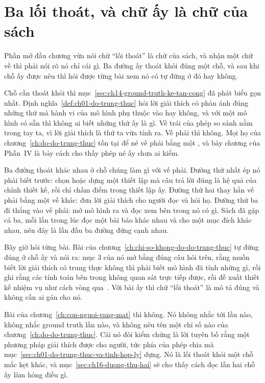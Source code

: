 \section{Ba lối thoát, và chữ ấy là chữ của sách}
\label{sec:ch16-ba-loi-thoat}

%
Phần mở đầu chương vừa nói chữ \enquote{lối thoát} là chữ của sách, và nhận một
chữ về thì phải nói rõ nó chỉ cái gì. Ba đường ấy thoát khỏi đúng một chỗ, và
sau khi chỗ ấy được nêu thì hỏi được từng bài xem nó có tự đứng ở đó hay không.

%
Chỗ cần thoát khỏi thì mục~\ref{sec:ch14-ground-truth-ke-tan-cong} đã phát biểu
gọn nhất. Định nghĩa~\ref{def:ch01-do-trung-thuc} hỏi lời giải thích có phản ánh
đúng những thứ mà hành vi của mô hình phụ thuộc vào hay không, và với một mô
hình có sẵn thì không ai biết những thứ ấy là gì. Vế trái của phép so sánh nằm
trong tay ta, vì lời giải thích là thứ ta vừa tính ra. Vế phải thì không. Mọi họ
 của
chương~\ref{ch:do-do-trung-thuc} tồn tại để né vế phải bằng một
, và bảy chương của Phần~IV là bảy cách cho thấy
phép né ấy chưa ai kiểm.

Ba đường thoát khác nhau ở chỗ chúng làm gì với vế phải. Đường thứ nhất ép nó
phải biết trước: chọn hoặc dựng một thiết lập mà câu trả lời đúng là hệ quả của
chính thiết kế, rồi chỉ chấm điểm trong thiết lập ấy. Đường thứ hai thay hẳn vế
phải bằng một vế khác: đưa lời giải thích cho người đọc và hỏi họ. Đường thứ ba
đi thẳng vào vế phải: mở mô hình ra và đọc xem bên trong nó có gì. Sách đã gặp
cả ba, mỗi lần trong lúc đọc một bài báo khác nhau và cho một mục đích khác
nhau, nên đây là lần đầu ba đường đứng cạnh nhau.

%
Bây giờ hỏi từng bài. Bài của chương~\ref{ch:chi-so-khong-do-do-trung-thuc} tự
đứng đúng ở chỗ ấy và nói ra: mục 3 của nó mở bằng đúng câu hỏi trên, rằng muốn
biết lời giải thích có trung thực không thì phải biết mô hình đã tính những gì,
rồi ghi rằng các tính toán bên trong không quan sát trực tiếp được, rồi đề xuất
thiết kế nhiệm vụ như cách vòng qua~\autocite{p21metrics}. Với bài ấy thì chữ
\enquote{lối thoát} là mô tả đúng và không cần ai gán cho nó.

Bài của chương~\ref{ch:con-nguoi-vang-mat} thì không. Nó không nhắc tới
 lần nào, không nhắc ground truth lần nào,
và không nêu tên một chỉ số nào
của chương~\ref{ch:do-do-trung-thuc}. Cái nó đòi kiểm chứng là lời tuyên bố rằng
một phương pháp giải thích được cho người, tức phía
 của phép chia mà
mục~\ref{sec:ch01-do-trung-thuc-va-tinh-hop-ly} dựng. Nó là lối thoát khỏi một
chỗ mắc kẹt khác, và mục~\ref{sec:ch16-duong-thu-hai} sẽ cho thấy cách
đọc lẫn hai chỗ ấy làm hỏng điều gì.

